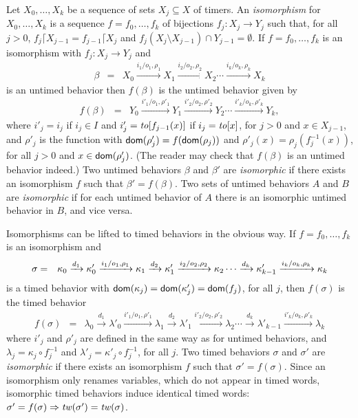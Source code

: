 Let $X_0,\ldots, X_k$ be a sequence of sets $X_j \subseteq X$ of timers.
An \emph{isomorphism} for $X_0,\ldots, X_k$ is a sequence $f = f_0 ,\ldots, f_k$ of bijections $f_j : X_j \rightarrow Y_j$ such that,
for all $j>0$, $f_j \lceil X_{j-1} = f_{j-1} \lceil X_j$ and $f_j (X_j \setminus X_{j-1}) \cap Y_{j-1} = \emptyset$.
If $f = f_0 ,\ldots, f_k$ is an isomorphism with $f_j : X_j \rightarrow Y_j$ and
\begin{eqnarray*}
\beta & = & X_0 \xrightarrow{i_1/o_1, \rho_1} X_1  \xrightarrow{i_2/o_2, \rho_2} X_2 \cdots \xrightarrow{i_k/o_k, \rho_k} X_{k}
\end{eqnarray*}
is an untimed behavior then $f(\beta)$ is the untimed behavior given by
\begin{eqnarray*}
f(\beta) & = & Y_0 \xrightarrow{i'_1/o_1, \rho'_1} Y_1  \xrightarrow{i'_2/o_2, \rho'_2} Y_2 \cdots \xrightarrow{i'_k/o_k, \rho'_k} Y_{k},
\end{eqnarray*}
where 
$i'_j = i_j$ if $i_j \in I$ and $i'_j = \mathit{to}[f_{j-1}(x)]$ if $i_j = \mathit{to}[x]$, for $j>0$ and $x \in X_{j-1}$, and
$\rho'_j$ is the function with ${\textsf{dom}}(\rho'_j) = f({\textsf{dom}}(\rho_j))$ and
$\rho'_j(x) = \rho_j ( f_j^{-1}(x))$, for all $j>0$ and $x\in{\textsf{dom}}(\rho'_j)$.
(The reader may check that $f(\beta)$ is an untimed behavior indeed.)
Two untimed behaviors $\beta$ and $\beta'$ are \emph{isomorphic} if there exists an isomorphism $f$ such that
$\beta' = f(\beta)$.
Two sets of untimed behaviors $A$ and $B$ are \emph{isomorphic} if for each untimed behavior of $A$ there is an isomorphic untimed behavior in $B$,
and vice versa.
\iflong

Isomorphisms can be lifted to timed behaviors in the obvious way. If $f = f_0 ,\ldots, f_k$ is an isomorphism and
\begin{eqnarray*}
\sigma & = & \kappa_0 \xrightarrow{d_1} \kappa'_0 \xrightarrow{i_1/o_1, \rho_1} \kappa_1 \xrightarrow{d_2} \kappa'_1 \xrightarrow{i_2/o_2, \rho_2} \kappa_2 \cdots
\xrightarrow{d_k} \kappa'_{k-1} \xrightarrow{i_k/o_k, \rho_k} \kappa_{k}
\end{eqnarray*}
is a timed behavior with ${\textsf{dom}}(\kappa_j) = {\textsf{dom}}(\kappa'_j) = {\textsf{dom}}(f_j)$, for all $j$, then $f(\sigma)$ is
the timed behavior
\begin{eqnarray*}
f(\sigma) & = & \lambda_0 \xrightarrow{d_1} \lambda'_0 \xrightarrow{i'_1/o_1, \rho'_1} \lambda_1 \xrightarrow{d_2} \lambda'_1 \xrightarrow{i'_2/o_2, \rho'_2} \lambda_2 \cdots
\xrightarrow{d_k} \lambda'_{k-1} \xrightarrow{i'_k/o_k, \rho'_k} \lambda_{k}
\end{eqnarray*}
where $i'_j$ and $\rho'_j$ are defined in the same way as for untimed behaviors, and
$\lambda_j = \kappa_j \circ f_j^{-1}$ and $\lambda'_j = \kappa'_j \circ f_j^{-1}$, for all $j$.
Two timed behaviors $\sigma$ and $\sigma'$ are \emph{isomorphic} if there exists an isomorphism $f$ such that
$\sigma' = f(\sigma)$.
Since an isomorphism only renames variables, which do not appear in timed words, 
isomorphic timed behaviors induce identical timed words: $\sigma' = f(\sigma) \Rightarrow \mathit{tw}(\sigma') = \mathit{tw}(\sigma)$.

